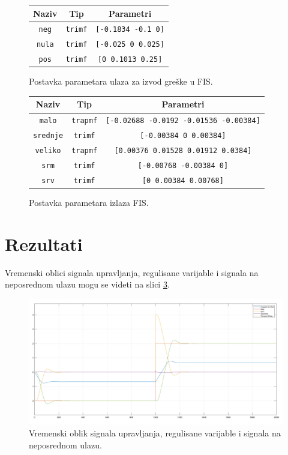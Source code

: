 \documentclass[10pt,a4paper,titlepage,croatian]{article}
\begin{document}
\begin{figure}[H]
    \centering
    \begin{tabular}{|c|c|c|}
        \hline
        Naziv & Tip & Parametri \\
        \hline
        \texttt{neg} & \texttt{trimf} & \texttt{[-0.1834 -0.1 0]} \\
        \hline
        \texttt{nula} & \texttt{trimf} & \texttt{[-0.025 0 0.025]} \\
        \hline
        \texttt{pos} & \texttt{trimf} & \texttt{[0 0.1013 0.25]} \\
        \hline
    \end{tabular}
    \caption{Postavka parametara ulaza za izvod greške u FIS.}
    \label{in-de}
\end{figure}

\begin{figure}[H]
    \centering
    \begin{tabular}{|c|c|c|}
        \hline
        Naziv & Tip & Parametri \\
        \hline
        \texttt{malo} & \texttt{trapmf} & \texttt{[-0.02688 -0.0192 -0.01536 -0.00384]} \\
        \hline
        \texttt{srednje} & \texttt{trimf} & \texttt{[-0.00384 0 0.00384]} \\
        \hline
        \texttt{veliko} & \texttt{trapmf} & \texttt{[0.00376 0.01528 0.01912 0.0384]} \\
        \hline
        \texttt{srm} & \texttt{trimf} & \texttt{[-0.00768 -0.00384 0]} \\
        \hline
        \texttt{srv} & \texttt{trimf} & \texttt{[0 0.00384 0.00768]} \\
        \hline
    \end{tabular}
    \caption{Postavka parametara izlaza FIS.}
    \label{out}
\end{figure}

\section{Rezultati}
Vremenski oblici signala upravljanja, regulisane varijable i signala na neposrednom ulazu mogu se videti na slici \ref{Diagram}.

\begin{figure}[H]
    \centering
    \includegraphics[width=\textwidth]{FL_Diagram.png}
    \caption{Vremenski oblik signala upravljanja, regulisane varijable i signala na neposrednom ulazu.}
    \label{Diagram}
\end{figure}
\end{document}
